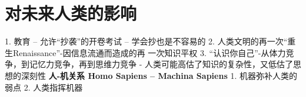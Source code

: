  \section{对未来人类的影响}
1. 教育 – 允许“抄袭”的开卷考试 – 学会抄也是不容易的
2. 人类文明的再一次“重生Renaissance”-因信息流通而造成的再 一次知识平权
3. “认识你自己”-从体力竞争，到记忆力竞争，再到思维力竞争 - 人类可能高估了知识的复杂性，又低估了思想的深刻性
{\bf 人-机关系 Homo Sapiens – Machina Sapiens}
1. 机器弥补人类的弱点
2. 人类指挥机器
\nocite{*}
\printbibliography[heading=bibintoc, title=\ebibname]
\newpage
